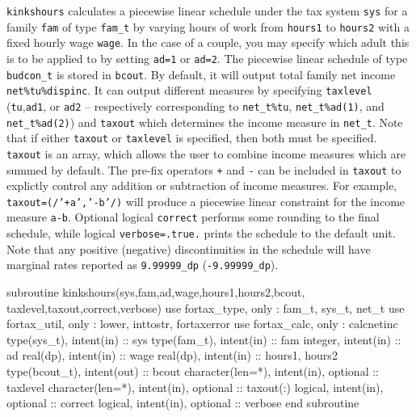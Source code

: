 \documentclass[11pt,thmsa,letter,ukenglish]{article}
\begin{document}
\noindent\texttt{kinkshours} calculates a piecewise linear schedule under the tax system \texttt{sys} for a family \texttt{fam} of type \texttt{fam\_t} by varying hours of work from \texttt{hours1} to \texttt{hours2} with a fixed hourly wage \texttt{wage}. In the case of a couple, you may specify which adult this is to be applied to by setting \texttt{ad=1} or \texttt{ad=2}. The piecewise linear schedule of type \texttt{budcon\_t} is stored in \texttt{bcout}.  By default, it will output total family net income \texttt{net\%tu\%dispinc}. It can output different measures by specifying \texttt{taxlevel} (\texttt{tu},\texttt{ad1}, or \texttt{ad2} -- respectively corresponding to \texttt{net\_t\%tu}, \texttt{net\_t\%ad(1)}, and \texttt{net\_t\%ad(2)}) and \texttt{taxout} which determines the income measure in \texttt{net\_t}. Note that if either \texttt{taxout} or \texttt{taxlevel} is specified, then both must be specified. \texttt{taxout} is an array, which allows the user to combine income measures which are summed by default. The pre-fix operators \texttt{+} and \texttt{-} can be included in \texttt{taxout} to explictly control any addition or subtraction of income measures. For example, \texttt{taxout=(/'+a','-b'/)} will produce a piecewise linear constraint for the income measure \texttt{a-b}. Optional logical \texttt{correct} performs some rounding to the final schedule, while logical \texttt{verbose=.true.} prints the schedule to the default unit. Note that any positive (negative) discontinuities in the schedule will have marginal rates reported as \texttt{9.99999\_dp} (\texttt{-9.99999\_dp}).

\begin{fortrancode}
subroutine kinkshours(sys,fam,ad,wage,hours1,hours2,bcout, taxlevel,taxout,correct,verbose)
    use fortax_type,  only : fam_t, sys_t, net_t
    use fortax_util,  only : lower, inttostr, fortaxerror
    use fortax_calc,  only : calcnetinc
    type(sys_t),      intent(in)  :: sys
    type(fam_t),      intent(in)  :: fam
    integer,          intent(in)  :: ad
    real(dp),         intent(in)  :: wage
    real(dp),         intent(in)  :: hours1, hours2
    type(bcout_t),    intent(out) :: bcout
    character(len=*), intent(in), optional :: taxlevel
    character(len=*), intent(in), optional :: taxout(:)
    logical,          intent(in), optional :: correct
    logical,          intent(in), optional :: verbose
end subroutine
\end{fortrancode}
\end{document}

